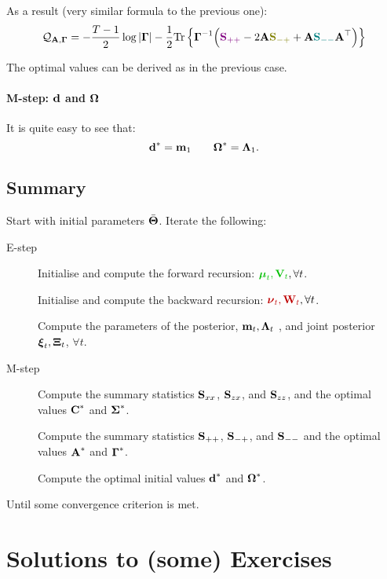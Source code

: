As a result (very similar formula to the previous one):
\begin{align}
\mathcal{Q}_{\bs{A},\bs{\Gamma}} = -\frac{T-1}{2}\log|\bs{\Gamma}| -\frac{1}{2} \textrm{Tr}\left\{\bs{\Gamma}^{-1}\Big( \paint{myfuture}{\bs{S}_{++}} - 2\bs{A}\paint{mymix}{\bs{S}_{-+}} +\bs{A}\paint{mypresent}{\bs{S}_{--}}\bs{A}^\top  \Big)\right\}
\end{align}

The optimal values can be derived as in the previous case.

\paragraph{M-step: $\boldsymbol{\mathbf{d}}$ and $\boldsymbol{\mathbf{\Omega}}$} It is quite easy to see that:
\begin{equation}
 \boldsymbol{\mathbf{d}}^* = \boldsymbol{\mathbf{m}}_1 \qquad \boldsymbol{\mathbf{\Omega}}^* = \boldsymbol{\mathbf{\Lambda}}_1.
\end{equation}

\subsection{Summary}
 Start with initial parameters $\bar{\boldsymbol{\mathbf{\Theta}}}$. Iterate the following:
 \begin{description}
  \item[E-step] Initialise and compute the forward recursion: $\paint{mygreen}{\bs{\mu}_t, \bs{V}_t}, \forall t$.
  \item[] Initialise and compute the backward recursion: $\paint{myred}{\bs{\nu}_t, \bs{W}_t}, \forall t$.
  \item[] Compute the parameters of the posterior, $\boldsymbol{\mathbf{m}}_t,\boldsymbol{\mathbf{\Lambda}}_t$ , and joint posterior $\boldsymbol{\mathbf{\xi}}_t,\boldsymbol{\mathbf{\Xi}}_t$, $\forall t$.
  \item[M-step] Compute the summary statistics $\boldsymbol{\mathbf{S}}_{xx}$, $\boldsymbol{\mathbf{S}}_{zx}$, and $\boldsymbol{\mathbf{S}}_{zz}$, and the optimal values $\boldsymbol{\mathbf{C}}^*$ and $\boldsymbol{\mathbf{\Sigma}}^*$.
  \item[] Compute the summary statistics $\boldsymbol{\mathbf{S}}_{++}$, $\boldsymbol{\mathbf{S}}_{-+}$, and $\boldsymbol{\mathbf{S}}_{--}$ and the optimal values $\boldsymbol{\mathbf{A}}^*$ and $\boldsymbol{\mathbf{\Gamma}}^*$.
  \item[] Compute the optimal initial values $\boldsymbol{\mathbf{d}}^*$ and $\boldsymbol{\mathbf{\Omega}}^*$.
 \end{description}
Until some convergence criterion is met.


\section*{Solutions to (some) Exercises}

